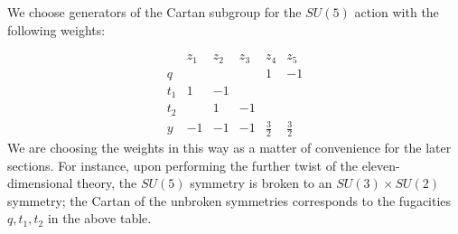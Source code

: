 \iffalse
We choose generators of the Cartan subgroup for the $SU(5)$ action with the following weights:

\[\begin{array}{|c|c|c|c|c|c|}
& z_1 & z_2 & z_3 & z_4 & z_5 \\
\hline
q & & & & 1 & -1 \\
t_1 & 1 & -1 & & & \\
t_2 & & 1 & -1 & & \\
y & -1 & -1 & -1 &\frac 3 2 & \frac 3 2
\end{array}\]
We are choosing the weights in this way as a matter of convenience for the later sections. 
For instance, upon performing the further twist of the eleven-dimensional theory, the $SU(5)$ symmetry is broken to an $SU(3)\times SU(2)$ symmetry; the Cartan of the unbroken symmetries corresponds to the fugacities $q, t_1, t_2$ in the above table. 

